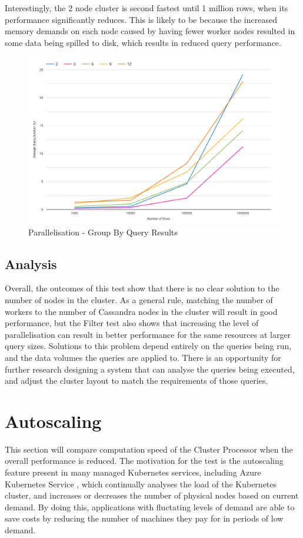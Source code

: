 Interestingly, the 2 node cluster is second fastest until 1 million rows, when its performance significantly reduces. This is likely to be because the increased memory demands on each node caused by having fewer worker nodes resulted in some data being spilled to disk, which results in reduced query performance.

\begin{figure}[ht]
	\centering
	\includegraphics[width=0.8\linewidth]{chapters/diagrams/testing/group-by-simple-parallelisation-test}
	\caption{Parallelisation - Group By Query Results}
	\label{fig:group-by-simple-parallelisation-test}
\end{figure}

\subsection{Analysis}
Overall, the outcomes of this test show that there is no clear solution to the number of nodes in the cluster. As a general rule, matching the number of workers to the number of Cassandra nodes in the cluster will result in good performance, but the Filter test also shows that increasing the level of parallelisation can result in better performance for the same resources at larger query sizes. Solutions to this problem depend entirely on the queries being run, and the data volumes the queries are applied to. There is an opportunity for further research designing a system that can analyse the queries being executed, and adjust the cluster layout to match the requirements of those queries.

\section{Autoscaling}
This section will compare computation speed of the Cluster Processor when the overall performance is reduced. The motivation for the test is the autoscaling feature present in many managed Kubernetes services, including Azure Kubernetes Service , which continually analyses the load of the Kubernetes cluster, and increases or decreases the number of physical nodes based on current demand. By doing this, applications with fluctating levels of demand are able to save costs by reducing the number of machines they pay for in periods of low demand.

